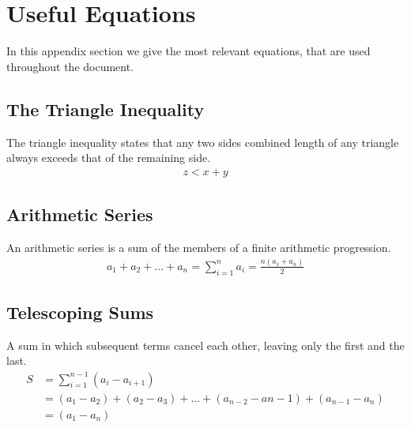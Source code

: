 
\thispagestyle{fancyplain}

\chapter{Useful Equations}
\label{appendix:equations}
In this appendix section we give the most relevant equations, that are used
throughout the document.

\section{The Triangle Inequality}
\label{appendix:equations|eqn:triangle-inequality}
The triangle inequality states that any two sides combined length of any
triangle always exceeds that of the remaining side.
\begin{align}
	z < x + y
\end{align}

\section{Arithmetic Series}
\label{appendix:equations|eqn:arithmetic-series}
An arithmetic series is a sum of the members of a finite arithmetic
progression.
\begin{align}
	a_1 + a_2 + \dots + a_n = \sum_{i=1}^{n}a_i = \frac{n(a_1 + a_n)}{2}
\end{align}

\section{Telescoping Sums}
\label{appendix:equations|eqn:telescoping}
A sum in which subsequent terms cancel each other, leaving only the first and
the last.
\begin{align}
	S &= \sum_{i=1}^{n-1}(a_{i} - a_{i+1}) \\
	&= (a_1-a_2)+(a_2-a_3) + \dots + (a_{n-2}-a{n-1}) + (a_{n-1}-a_n)
	\nonumber \\
	&= (a_1 - a_n) \nonumber
\end{align}

